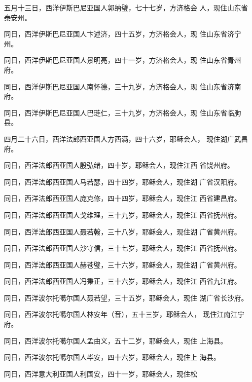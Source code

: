 五月十三日，西洋伊斯巴尼亚国人郭纳璧，七十七岁，方济格会%
人，现住山东省泰安州。%
\par
同日，西洋伊斯巴尼亚国人卞述济，四十五岁，方济格会人，现%
住山东省济宁州。%
\par
同日，西洋伊斯巴尼亚国人景明亮，四十一岁，方济格会人，现%
住山东省青州府。%
\par
同日，西洋伊斯巴尼亚国人南怀德，三十九岁，方济格会人，现%
住山东省济南府。%
\par
同日，西洋伊斯巴尼亚国人巴琏仁，三十九岁，方济格会人，现%
住山东省临朐县。%
\par
四月二十六日，西洋法郎西亚国人方西满，四十六岁，耶稣会人，%
现住湖广武昌府。%
\par
同日，西洋法郎西亚国人殷弘绪，四十岁，耶稣会人，现住江西%
省饶州府。%
\par
同日，西洋法郎西亚国人马若瑟，四十四岁，耶稣会人，现住湖%
广省汉阳府。%
\par
同日，西洋法郎西亚国人庞克修，四十四岁，耶稣会人，现住江%
西省建昌府。%
\par
同日，西洋法郎西亚国人戈维理，三十九岁，耶稣会人，现住江%
西省抚州府。%
\par
同日，西洋法郎西亚国人聂若翰，三十八岁，耶稣会人，现住湖%
广省黄州府。%
\par
同日，西洋法郎西亚国人沙守信，三十七岁，耶稣会人，现住江%
西省抚州府。%
\par
同日，西洋法郎西亚国人赫苍璧，三十六岁，耶稣会人，现住湖%
广省黄州府。%
\par
同日，西洋法郎西亚国人冯秉正，三十六岁，耶稣会人，现住江%
西省九江府。%
\par
同日，西洋波尔托噶尔国人聂若望，三十五岁，耶稣会人，现住%
湖广省长沙府。%
\par
同日，西洋波尔托噶尔国人林安年（音），五十三岁，耶稣会人，%
现住江南江宁府。%
\par
同日，西洋波尔托噶尔国人孟由义，五十二岁，耶稣会人，现住%
上海县。%
\par
同日，西洋波尔托噶尔国人毕安，四十六岁，耶稣会人，现住上%
海县。%
\par
同日，西洋意大利亚国人利国安，四十一岁，耶稣会人，现住松%
